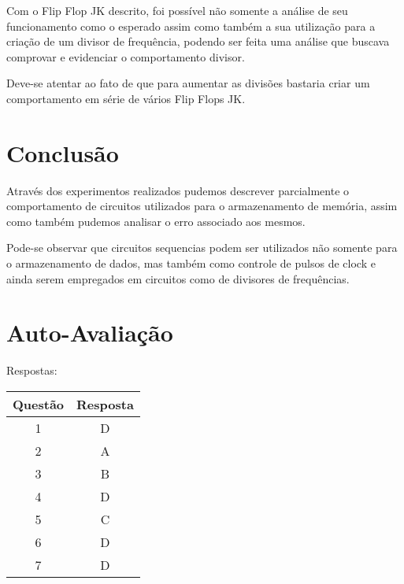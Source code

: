 \documentclass[12pt]{article}
\begin{document}
Com o Flip Flop JK descrito, foi possível não somente a análise de seu
funcionamento como o esperado assim como também a sua utilização para a criação
de um divisor de frequência, podendo ser feita uma análise que buscava comprovar
e evidenciar o comportamento divisor.

Deve-se atentar ao fato de que para aumentar as divisões bastaria criar um
comportamento em série de vários Flip Flops JK.

\section{Conclusão}\label{sec:Conclusao}

Através dos experimentos realizados pudemos descrever parcialmente o
comportamento de circuitos utilizados para o armazenamento de memória, assim
como também pudemos analisar o erro associado aos mesmos.

Pode-se observar que circuitos sequencias podem ser utilizados não somente para
o armazenamento de dados, mas também como controle de pulsos de clock e ainda
serem empregados em circuitos como de divisores de frequências.

\nocite{*}



\newpage
\section*{Auto-Avaliação}

Respostas:

\begin{table}[H]
      \begin{tabular}{|c|c|} \hline
      \textbf{Questão} & \textbf{Resposta}\\
      \hline
      1  & D \\ \hline
      2  & A \\ \hline
      3  & B \\ \hline
      4  & D \\ \hline
      5  & C \\ \hline
      6  & D \\ \hline
      7  & D \\ \hline
      \end{tabular}
\end{table}
\end{document}

